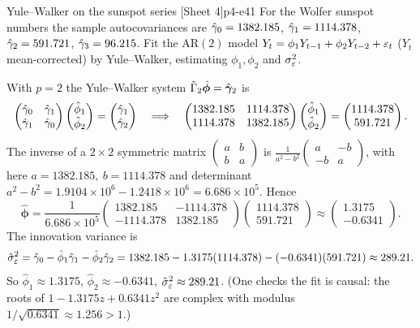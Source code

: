 \begin{exercise}{Yule--Walker on the sunspot series \quad\textnormal{[Sheet 4]}}{p4-e41}
For the Wolfer sunspot numbers the sample autocovariances are
$\hat{\gamma}_0=1382.185$, $\hat{\gamma}_1=1114.378$, $\hat{\gamma}_2=591.721$,
$\hat{\gamma}_3=96.215$. Fit the AR$(2)$ model
$Y_t=\phi_1Y_{t-1}+\phi_2Y_{t-2}+\varepsilon_t$ ($Y_t$ mean-corrected) by Yule--Walker,
estimating $\phi_1,\phi_2$ and $\sigma_\varepsilon^2$.
\end{exercise}
\begin{solution}
With $p=2$ the Yule--Walker system
$\hat\Gamma_2\hat{\boldsymbol\phi}=\hat{\boldsymbol{\gamma}}_2$ is
\[
\begin{pmatrix}\hat{\gamma}_0 & \hat{\gamma}_1\\ \hat{\gamma}_1 & \hat{\gamma}_0\end{pmatrix}
\begin{pmatrix}\hat\phi_1\\ \hat\phi_2\end{pmatrix}
=\begin{pmatrix}\hat{\gamma}_1\\ \hat{\gamma}_2\end{pmatrix}
\quad\Longrightarrow\quad
\begin{pmatrix}1382.185 & 1114.378\\ 1114.378 & 1382.185\end{pmatrix}
\begin{pmatrix}\hat\phi_1\\ \hat\phi_2\end{pmatrix}
=\begin{pmatrix}1114.378\\ 591.721\end{pmatrix}.
\]
The inverse of a $2\times2$ symmetric matrix
$\left(\begin{smallmatrix}a&b\\ b&a\end{smallmatrix}\right)$ is
$\tfrac{1}{a^2-b^2}\left(\begin{smallmatrix}a&-b\\ -b&a\end{smallmatrix}\right)$,
with here $a=1382.185,\ b=1114.378$ and determinant
$a^2-b^2=1.9104\times10^6-1.2418\times10^6=6.686\times10^5$. Hence
\[
\hat{\boldsymbol\phi}
=\frac{1}{6.686\times10^5}
\begin{pmatrix}1382.185 & -1114.378\\ -1114.378 & 1382.185\end{pmatrix}
\begin{pmatrix}1114.378\\ 591.721\end{pmatrix}
\approx\begin{pmatrix}1.3175\\ -0.6341\end{pmatrix}.
\]
The innovation variance is
\[
\hat\sigma_\varepsilon^2=\hat{\gamma}_0-\hat\phi_1\hat{\gamma}_1-\hat\phi_2\hat{\gamma}_2
=1382.185-1.3175(1114.378)-(-0.6341)(591.721)\approx289.21 .
\]
So $\hat\phi_1\approx1.3175$, $\hat\phi_2\approx-0.6341$,
$\hat\sigma_\varepsilon^2\approx289.21$. (One checks the fit is causal: the roots of
$1-1.3175z+0.6341z^2$ are complex with modulus
$1/\sqrt{0.6341}\approx1.256>1$.)
\end{solution}

